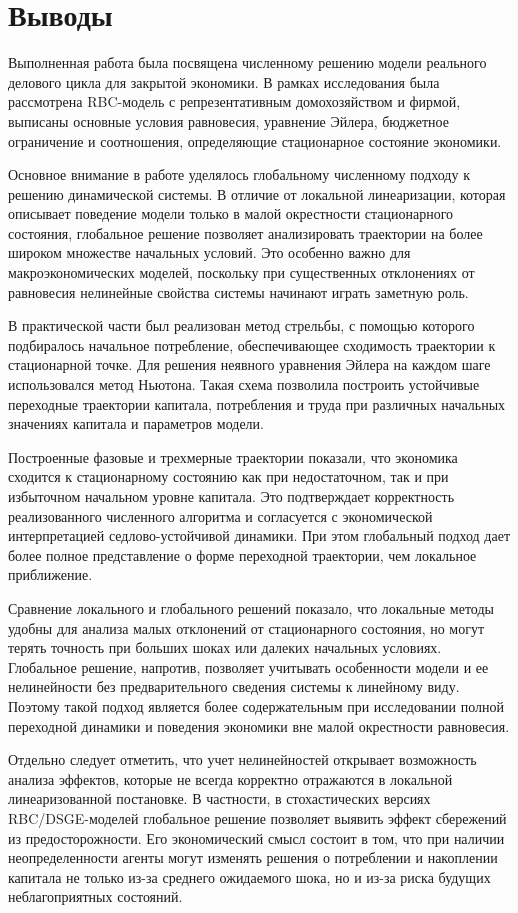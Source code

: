 \chapter{Выводы}

Выполненная работа была посвящена численному решению модели реального делового цикла для закрытой экономики. В рамках исследования была рассмотрена RBC-модель с репрезентативным домохозяйством и фирмой, выписаны основные условия равновесия, уравнение Эйлера, бюджетное ограничение и соотношения, определяющие стационарное состояние экономики.

Основное внимание в работе уделялось глобальному численному подходу к решению динамической системы. В отличие от локальной линеаризации, которая описывает поведение модели только в малой окрестности стационарного состояния, глобальное решение позволяет анализировать траектории на более широком множестве начальных условий. Это особенно важно для макроэкономических моделей, поскольку при существенных отклонениях от равновесия нелинейные свойства системы начинают играть заметную роль.

В практической части был реализован метод стрельбы, с помощью которого подбиралось начальное потребление, обеспечивающее сходимость траектории к стационарной точке. Для решения неявного уравнения Эйлера на каждом шаге использовался метод Ньютона. Такая схема позволила построить устойчивые переходные траектории капитала, потребления и труда при различных начальных значениях капитала и параметров модели.

Построенные фазовые и трехмерные траектории показали, что экономика сходится к стационарному состоянию как при недостаточном, так и при избыточном начальном уровне капитала. Это подтверждает корректность реализованного численного алгоритма и согласуется с экономической интерпретацией седлово-устойчивой динамики. При этом глобальный подход дает более полное представление о форме переходной траектории, чем локальное приближение.

Сравнение локального и глобального решений показало, что локальные методы удобны для анализа малых отклонений от стационарного состояния, но могут терять точность при больших шоках или далеких начальных условиях. Глобальное решение, напротив, позволяет учитывать особенности модели и ее нелинейности без предварительного сведения системы к линейному виду. Поэтому такой подход является более содержательным при исследовании полной переходной динамики и поведения экономики вне малой окрестности равновесия.

Отдельно следует отметить, что учет нелинейностей открывает возможность анализа эффектов, которые не всегда корректно отражаются в локальной линеаризованной постановке. В частности, в стохастических версиях RBC/DSGE-моделей глобальное решение позволяет выявить эффект сбережений из предосторожности. Его экономический смысл состоит в том, что при наличии неопределенности агенты могут изменять решения о потреблении и накоплении капитала не только из-за среднего ожидаемого шока, но и из-за риска будущих неблагоприятных состояний.

